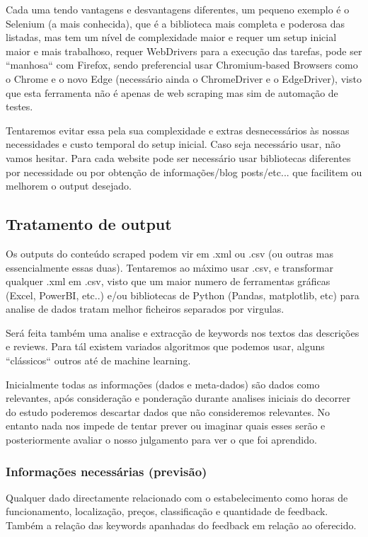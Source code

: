 \documentclass[a4paper,10pt]{article}
\begin{document}
Cada uma tendo vantagens e desvantagens diferentes, um pequeno exemplo é o Selenium (a mais conhecida), que é a biblioteca mais completa e poderosa das listadas, mas tem um nível de complexidade maior e requer um setup inicial maior e mais trabalhoso, requer WebDrivers para a execução das tarefas, pode ser ``manhosa`` com Firefox, sendo preferencial usar Chromium-based Browsers como o Chrome e o novo Edge (necessário ainda o ChromeDriver e o EdgeDriver), visto que esta ferramenta não é apenas de web scraping mas sim de automação de testes.

Tentaremos evitar essa pela sua complexidade e extras desnecessários às nossas necessidades e custo temporal do setup inicial.
Caso seja necessário usar, não vamos hesitar.
Para cada website pode ser necessário usar bibliotecas diferentes por necessidade ou por obtenção de informações/blog posts/etc... que facilitem ou melhorem o output desejado.

\subsection{Tratamento de output}

Os outputs do conteúdo scraped podem vir em .xml ou .csv (ou outras mas essencialmente essas duas).
Tentaremos ao máximo usar .csv, e transformar qualquer .xml em .csv, visto que um maior numero de ferramentas gráficas (Excel, PowerBI, etc..) e/ou bibliotecas de Python (Pandas, matplotlib, etc) para analise de dados tratam melhor ficheiros separados por virgulas.

Será feita também uma analise e extracção de keywords nos textos das descrições e reviews.
Para tál existem variados algoritmos que podemos usar, alguns ``clássicos`` outros até de machine learning.

Inicialmente todas as informações (dados e meta-dados) são dados como relevantes, após consideração e ponderação durante analises iniciais do decorrer do estudo poderemos descartar dados que não consideremos relevantes.
No entanto nada nos impede de tentar prever ou imaginar quais esses serão e posteriormente avaliar o nosso julgamento para ver o que foi aprendido.

\subsubsection{Informações necessárias (previsão)}

Qualquer dado directamente relacionado com o estabelecimento como horas de funcionamento, localização, preços, classificação e quantidade de feedback.
Também a relação das keywords apanhadas do feedback em relação ao oferecido.
\end{document}
